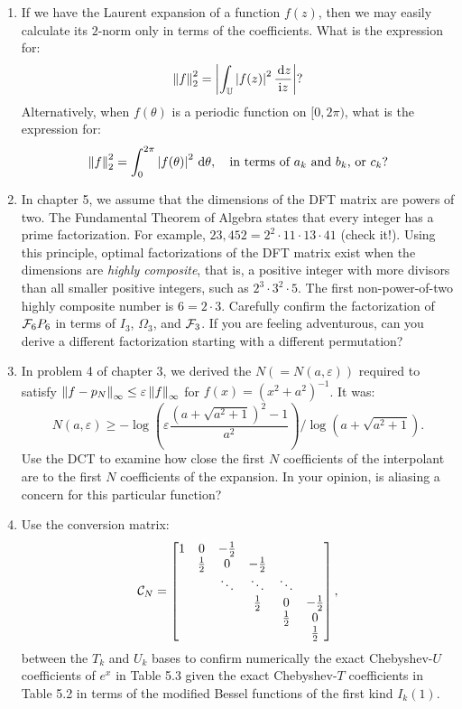 \documentclass[11pt,letterpaper]{article}
\begin{document}
\begin{enumerate}

\item If we have the Laurent expansion of a function $f(z)$, then we may easily calculate its $2$-norm only in terms of the coefficients. What is the expression for:
\[
\left\|{f}\right\|_2^2 = \left|{\int_{\mathbb{U}} \left|{f(z)}\right|^2\frac{{\rm\,d} z}{{\rm i} z}}\right| ?
\]
Alternatively, when $f(\theta)$ is a periodic function on $[0,2\pi)$, what is the expression for:
\[
\left\|{f}\right\|_2^2 = \int_0^{2\pi} \left|{f(\theta)}\right|^2{\rm\,d}\theta,\quad \hbox{in terms of $a_k$ and $b_k$, or $c_k$?}
\]

\item In chapter 5, we assume that the dimensions of the DFT matrix are powers of two. The Fundamental Theorem of Algebra states that every integer has a prime factorization. For example, $23,452 = 2^2\cdot11\cdot13\cdot41$ (check it!). Using this principle, optimal factorizations of the DFT matrix exist when the dimensions are {\em highly composite}, that is, a positive integer with more divisors than all smaller positive integers, such as $2^3\cdot3^2\cdot5$. The first non-power-of-two highly composite number is $6 = 2\cdot3$. Carefully confirm the factorization of $\mathcal{F}_6P_6$ in terms of $I_3$, $\Omega_3$, and $\mathcal{F}_3$. If you are feeling adventurous, can you derive a different factorization starting with a different permutation?

\item In problem 4 of chapter 3, we derived the $N(=N(a,\varepsilon))$ required to satisfy $\left\|{f-p_N}\right\|_\infty \le \varepsilon \left\|{f}\right\|_\infty$ for $f(x) = (x^2+a^2)^{-1}$. It was:
\[
N(a,\varepsilon) \ge -\log\left(\varepsilon\dfrac{(a+\sqrt{a^2+1})^2-1}{a^2}\right)/\log(a+\sqrt{a^2+1}).
\]
Use the DCT to examine how close the first $N$ coefficients of the interpolant are to the first $N$ coefficients of the expansion. In your opinion, is aliasing a concern for this particular function?

\item Use the conversion matrix:
\[
\mathcal{C}_N = \begin{bmatrix}
1 & 0 & -\tfrac{1}{2}\\
& \tfrac{1}{2} & 0 & -\tfrac{1}{2}\\
& & \ddots & \ddots & \ddots\\
& & & \tfrac{1}{2} & 0 & -\tfrac{1}{2}\\
& & & & \tfrac{1}{2} & 0\\
& & & & & \tfrac{1}{2}\\
\end{bmatrix},
\]
between the $T_k$ and $U_k$ bases to confirm numerically the exact Chebyshev-$U$ coefficients of $e^x$ in Table 5.3 given the exact Chebyshev-$T$ coefficients in Table 5.2 in terms of the modified Bessel functions of the first kind $I_k(1)$.

\end{enumerate}
\end{document}
